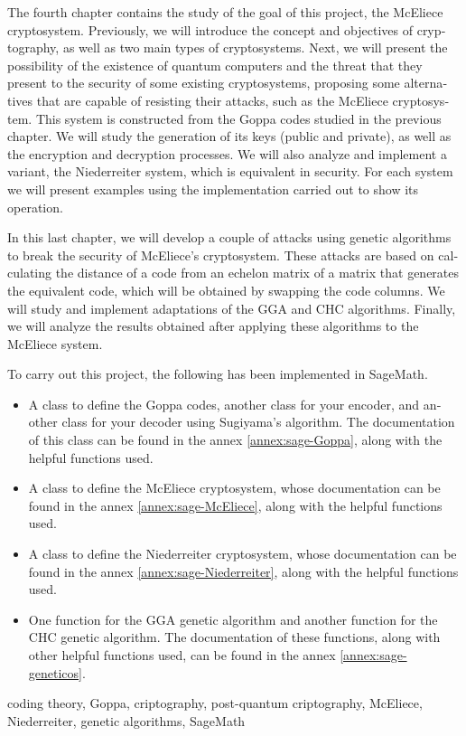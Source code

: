 \begin{otherlanguage}{english}
\newpage


The fourth chapter contains the study of the goal of this project, the McEliece cryptosystem. Previously, we will introduce the concept and objectives of cryptography, as well as two main types of cryptosystems. Next, we will present the possibility of the existence of quantum computers and the threat that they present to the security of some existing cryptosystems, proposing some alternatives that are capable of resisting their attacks, such as the McEliece cryptosystem. This system is constructed from the Goppa codes studied in the previous chapter. We will study the generation of its keys (public and private), as well as the encryption and decryption processes. We will also analyze and implement a variant, the Niederreiter system, which is equivalent in security. For each system we will present examples using the implementation carried out to show its operation.


In this last chapter, we will develop a couple of attacks using genetic algorithms to break the security of McEliece's cryptosystem. These attacks are based on calculating the distance of a code from an echelon matrix of a matrix that generates the equivalent code, which will be obtained by swapping the code columns. We will study and implement adaptations of the GGA and CHC algorithms. Finally, we will analyze the results obtained after applying these algorithms to the McEliece system.

To carry out this project, the following has been implemented in SageMath.

\begin{itemize}
    \item A class to define the Goppa codes, another class for your encoder, and another class for your decoder using Sugiyama's algorithm. The documentation of this class can be found in the annex \ref{annex:sage-Goppa}, along with the helpful functions used.
    \item A class to define the McEliece cryptosystem, whose documentation can be found in the annex \ref{annex:sage-McEliece}, along with the helpful functions used.
    \item A class to define the Niederreiter cryptosystem, whose documentation can be found in the annex \ref{annex:sage-Niederreiter}, along with the helpful functions used.
    \item One function for the GGA genetic algorithm and another function for the CHC genetic algorithm. The documentation of these functions, along with other helpful functions used, can be found in the annex \ref{annex:sage-geneticos}.
\end{itemize}

\small{ coding theory, \; Goppa, \; criptography, \; post-quantum criptography, \; McEliece, \; Niederreiter, \; genetic algorithms, \; SageMath}

\end{otherlanguage}